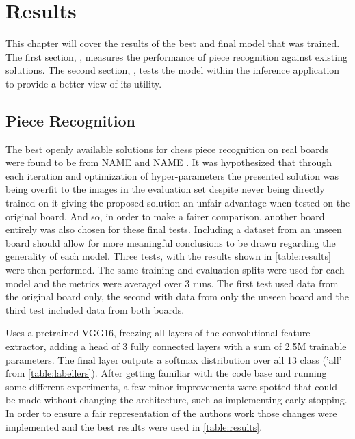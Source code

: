 \chapter{Results}
\label{results}

This chapter will cover the results of the best and final model that was trained.  The first section, , measures the performance
of piece recognition against existing solutions.  The second section, , tests the model within the inference application
to provide a better view of its utility.

\section{Piece Recognition}
\label{evaluation}

The best openly available solutions for chess piece recognition on real boards were found to be from NAME \cite{} and NAME \cite{}.
It was hypothesized that through each iteration and optimization of hyper-parameters the presented solution was being overfit to the 
images in the evaluation set despite never being directly trained on it giving the proposed solution an unfair advantage when tested on the original board.
And so, in order to make a fairer comparison, another board entirely was also chosen for these final tests.  
Including a dataset from an unseen board should allow for more meaningful conclusions to be drawn regarding the generality of each model.
Three tests, with the results shown in \autoref{table:results} were then performed.  The same training and evaluation splits were used for each model and 
the metrics were averaged over 3 runs.  The first test used data from the original board only, the second with data from only the unseen board and the 
third test included data from both boards.

\cite{} Uses a pretrained VGG16, freezing all layers of the convolutional feature extractor, adding a head of 3 fully connected layers with a sum of 2.5M 
trainable parameters.
The final layer outputs a softmax distribution over all 13 class ('all' from \autoref{table:labellers}).  After getting familiar with the code base and running some 
different experiments, a few minor improvements were spotted that could be made without changing the architecture, such as implementing early stopping. 
In order to ensure a fair representation of the authors work those changes were implemented and the best results were used in \autoref{table:results}.

